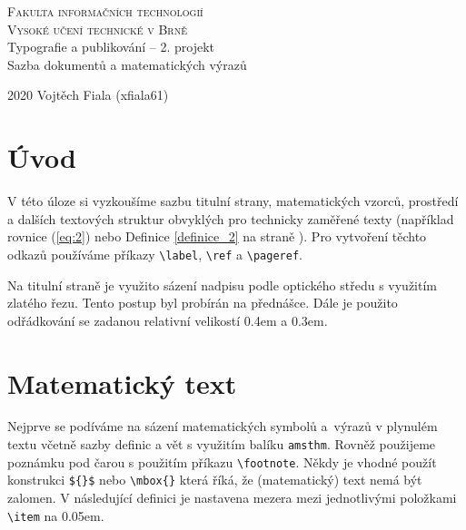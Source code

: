 \documentclass[a4paper, 11pt, twocolumn]{article}
\begin{document}
	\begin{titlepage}
		\begin{center}
			{\Huge\textsc{
				Fakulta informačních technologií\\[0.4em]
				Vysoké učení technické v Brně
			}}
			\\
			{\LARGE
				 Typografie a publikování -- 2. projekt\\[0.3em]
				 Sazba dokumentů a matematických výrazů
			}
		\end{center}
		{\Large
		    2020
			\hfill
			Vojtěch Fiala (xfiala61)
		}
	\end{titlepage}
	
    \section*{Úvod}
    \label{page_1}
       V této úloze si vyzkoušíme sazbu titulní strany, matematic\-kých vzorců, prostředí a dalších textových struktur obvyk\-lých pro technicky zaměřené texty (například rovnice (\ref{eq:2})
        nebo Definice \ref{definice_2} na straně \pageref{page_1}). Pro vytvoření těchto odkazů
        používáme příkazy \verb!\label!, \verb!\ref! a \verb!\pageref!.
    
        Na titulní straně je využito sázení nadpisu podle op\-tického středu s využitím zlatého řezu. Tento postup byl
        probírán na přednášce. Dále je použito odřádkování se
        zadanou relativní velikostí 0.4em a 0.3em.
    
    \section{Matematický text}
    
        Nejprve se podíváme na sázení matematických symbolů
        a~výrazů v plynulém textu včetně sazby definic a vět s vy\-užitím balíku \verb!amsthm!. Rovněž použijeme poznámku pod
        čarou s použitím příkazu \verb!\footnote!. Někdy je vhodné
        použít konstrukci \verb!${}$! nebo \verb!\mbox{}! která říká, že
        (matematický) text nemá být zalomen. V následující de\-finici je nastavena mezera mezi jednotlivými položkami
        \verb!\item! na 0.05em.
        
\end{document}
